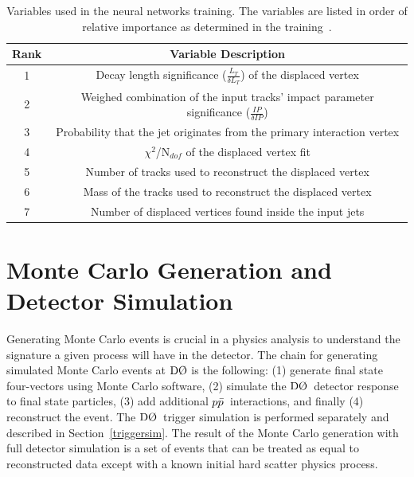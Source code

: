 \begin{table}[!h!tbp]
\begin{center}
\caption{Variables used in the neural networks training. The variables are listed in order of relative importance as determined in the training~\cite{bid}.}
\label{nnvars}
\begin{tabular}{c|c}
Rank	&	Variable Description	\\
\hline
1		&	Decay length significance ($\frac{L_{T}}{\delta L_{T}}$) of the displaced vertex	\\
2		&	Weighed combination of the input tracks' impact parameter significance ($\frac{IP}{\delta IP}$)	\\
3		&	Probability that the jet originates from the primary interaction vertex	\\
4		&	$\chi^{2}$/N$_{dof}$ of the displaced vertex fit	\\
5		&	Number of tracks used to reconstruct the displaced vertex	\\
6		&	Mass of the tracks used to reconstruct the displaced vertex	\\
7		&	Number of displaced vertices found inside the input jets		\\
\end{tabular}
\vspace{-0.1 in}
\end{center}
\end{table} 



\section{Monte Carlo Generation and Detector Simulation}
\label{simulation}

Generating Monte Carlo events is crucial in a physics analysis to understand the signature a given process will have in the detector. The chain for generating simulated Monte Carlo events at $\dzero$ is the following: (1) generate final state four-vectors using Monte Carlo software, (2) simulate the $\dzero$~detector response to final state particles, (3) add additional $\mbox{$p\bar{p}$}$~interactions, and finally (4) reconstruct the event. The $\dzero$~trigger simulation is performed separately and described in Section~\ref{triggersim}. The result of the Monte Carlo generation with full detector simulation is a set of events that can be treated as equal to reconstructed data except with a known initial hard scatter physics process.

